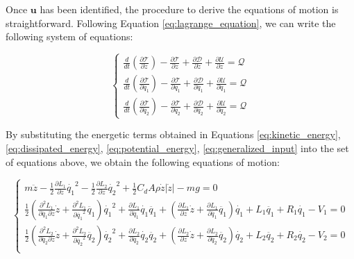 Once $\mathbf{u}$ has been identified, the procedure to derive the equations of motion is straightforward.
Following Equation \ref{eq:lagrange_equation}, we can write the following system of equations:

\begin{equation}
    \begin{cases}
        \frac{d}{dt} \left( \frac{\partial \mathcal{T}}{\partial \dot{z}} \right) - \frac{\partial \mathcal{T}}{\partial z} + \frac{\partial \mathcal{D}}{\partial \dot{z}} + \frac{\partial \mathcal{U}}{\partial z} = \mathcal{Q}         \\
        \frac{d}{dt} \left( \frac{\partial \mathcal{T}}{\partial \dot{q_1}} \right) - \frac{\partial \mathcal{T}}{\partial q_1} + \frac{\partial \mathcal{D}}{\partial \dot{q_1}} + \frac{\partial \mathcal{U}}{\partial q_1} = \mathcal{Q} \\
        \frac{d}{dt} \left( \frac{\partial \mathcal{T}}{\partial \dot{q_2}} \right) - \frac{\partial \mathcal{T}}{\partial q_2} + \frac{\partial \mathcal{D}}{\partial \dot{q_2}} + \frac{\partial \mathcal{U}}{\partial q_2} = \mathcal{Q}
    \end{cases}
\end{equation}

By substituting the energetic terms obtained in Equations \ref{eq:kinetic_energy}, \ref{eq:dissipated_energy}, \ref{eq:potential_energy}, \ref{eq:generalized_input} into the set of equations above, we obtain the following equations of motion:

\begin{equation}
    \begin{cases}
        m \ddot{z} - \frac{1}{2} \frac{\partial L_1}{\partial z} \dot{q_1}^2 - \frac{1}{2} \frac{\partial L_2}{\partial z} \dot{q_2}^2 + \frac{1}{2} C_d A \rho \dot{z} |\dot{z}| - m g = 0                                                                                                                                                                                                            \\
        \frac{1}{2} \left( \frac{\partial^2 L_1}{\partial \dot{q_1} \partial z} \dot{z} + \frac{\partial^2 L_1}{\partial \dot{q_1}^2} \ddot{q_1} \right) \dot{q_1}^2 + \frac{\partial L_1}{\partial \dot{q_1}} \dot{q_1} \ddot{q_1} + \left( \frac{\partial L_1}{\partial z} \dot{z} + \frac{\partial L_1}{\partial \dot{q_1}} \ddot{q_1} \right) \dot{q_1} + L_1 \ddot{q_1} + R_1 \dot{q_1} - V_1 = 0 \\
        \frac{1}{2} \left( \frac{\partial^2 L_2}{\partial \dot{q_2} \partial z} \dot{z} + \frac{\partial^2 L_2}{\partial \dot{q_2}^2} \ddot{q_2} \right) \dot{q_2}^2 + \frac{\partial L_2}{\partial \dot{q_2}} \dot{q_2} \ddot{q_2} + \left( \frac{\partial L_2}{\partial z} \dot{z} + \frac{\partial L_2}{\partial \dot{q_2}} \ddot{q_2} \right) \dot{q_2} + L_2 \ddot{q_2} + R_2 \dot{q_2} - V_2 = 0 \\
    \end{cases}
\end{equation}

